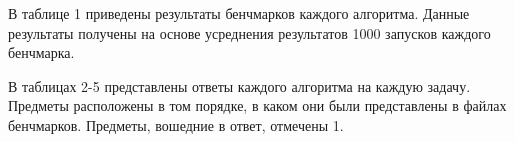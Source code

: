 \documentclass{article}
\begin{document}

В таблице 1 приведены результаты бенчмарков каждого алгоритма.
Данные результаты получены на основе усреднения результатов 1000 запусков каждого бенчмарка.

В таблицах 2-5 представлены ответы каждого алгоритма на каждую задачу.
Предметы расположены в том порядке, в каком они были представлены в файлах бенчмарков.
Предметы, вошедние в ответ, отмечены 1.
\end{document}
